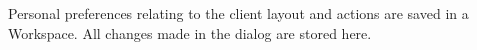 \item[Workspace]{Personal preferences relating to the client layout and 
actions are saved in a Workspace. All changes  made 
in the 
dialog are stored here.
}
